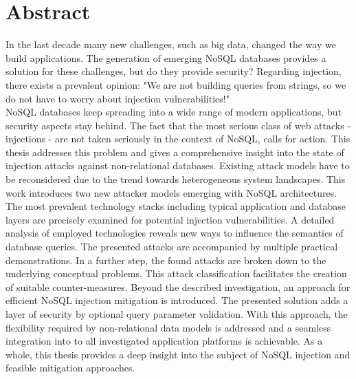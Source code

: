 \chapter*{Abstract} %
In the last decade many new challenges, such as big data, changed the way we build applications. The generation of emerging NoSQL databases provides a solution for these challenges, but do they provide security? Regarding injection, there exists a prevalent opinion: "We are not building queries from strings, so we do not have to worry about injection vulnerabilities!" \\

NoSQL databases keep spreading into a wide range of modern applications, but security aspects stay behind. The fact that the most serious class of web attacks - injections - are not taken seriously in the context of NoSQL, calls for action. This thesis addresses this problem and gives a comprehensive insight into the state of injection attacks against non-relational databases. Existing attack models have to be reconsidered due to the trend towards heterogeneous system landscapes. This work introduces two new attacker models emerging with NoSQL architectures. The most prevalent technology stacks including typical application and database layers are precisely examined for potential injection vulnerabilities. A detailed analysis of employed technologies reveals new ways to influence the semantics of database queries. The presented attacks are accompanied by multiple practical demonstrations. In a further step, the found attacks are broken down to the underlying conceptual problems. This attack classification facilitates the creation of suitable counter-measures. Beyond the described investigation, an approach for efficient NoSQL injection mitigation is introduced. The presented solution adds a layer of security by optional query parameter validation. With this approach, the flexibility required by non-relational data models is addressed and a seamless integration into to all investigated application platforms is achievable. As a whole, this thesis provides a deep insight into the subject of NoSQL injection and feasible mitigation approaches.